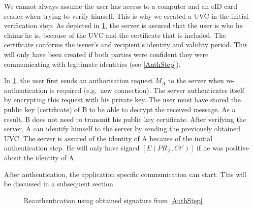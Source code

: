 We cannot always assume the user has access to a computer and an eID card reader when trying to verify himself. This is why we created a UVC in the initial verification step. As depicted in \cref{ReauthStep}, the server is assured that the user is who he claims he is, because of the UVC and the certificate that is included. The certificate conforms the issuer's and recipient's identity and validity period. This will only have been created if both parties were confident they were communicating with legitimate identities (see \cref{AuthStep}).

In \cref{ReauthStep}, the user first sends an authorisation request $M_A$ to the server when re-authentication is required (e.g.\ new connection). The server authenticates itself by encrypting this request with his private key. The user must have stored the public key (certificate) of B to be able to decrypt the received message. As a result, B does not need to transmit his public key certificate. After verifying the server, A can identify himself to the server by sending the previously obtained UVC. The server is assured of the identity of A because of the initial authentication step. He will only have signed $[E(PR_A,Ct')]$ if he was positive about the identity of A. %

After authentication, the application specific communication can start. This will be discussed in a subsequent section.

\begin{figure}[!ht]
  \renewcommand{\Bx}{8}
  \setcounter{CC}{0}
  \centering
  \caption{Reauthentication using obtained signature from \cref{AuthStep}}
  \label{ReauthStep}
\end{figure}

